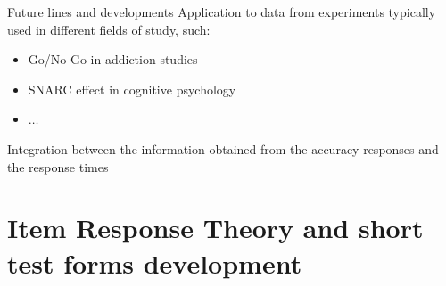 \documentclass[aspectratio=149, xcolor=table]{beamer}
\begin{document}
\begin{frame}{Future lines and developments}
	Application to data from experiments typically used in different fields of study, such: 
	\begin{itemize}
		\item Go/No-Go in addiction studies 
		\item SNARC effect in cognitive psychology 
		\item $\ldots$
	\end{itemize}
	
	\vspace{5mm}
	Integration between the information obtained from the accuracy responses and the response times
\end{frame}



%	
%	
%		
%		
%		
%		
%		
%	
%	
%		
%		
%		
%	
%	
%		
%		
%		
%	

\section[IRT and short test forms]{Item Response Theory and short test forms development}
\end{document}
